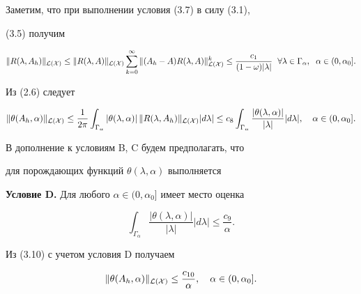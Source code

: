 


Заметим, что при выполнении условия (3.7) в силу (3.1), 


(3.5) получим


$$ 


\|R(\lambda,A_h)\|_{\cal L(X)}\le \|R(\lambda,A)\|_{\cal L(X)} 


\sum^\infty_{k=0}\|(A_h-A)R(\lambda,A)\|^k_{\cal L(X)}\le 


\frac{c_1}{(1-\omega)|\lambda|}\ \; \forall\lambda\in\Gamma_\alpha, 


\ \; \alpha\in(0,\alpha_0]. 


$$ 


Из (2.6) следует


\begin{equation} 


\|\theta(A_h,\alpha)\|_{\cal L(X)}\le\frac{1}{2\pi} 


\int_{\Gamma_\alpha}|\theta(\lambda,\alpha)|\,\|R(\lambda,A_h) 


\|_{\cal L(X)}|d\lambda|\le c_8\int_{\Gamma_\alpha} 


\frac{|\theta(\lambda,\alpha)|}{|\lambda|}|d\lambda|,\quad 


\alpha\in(0,\alpha_0]. 


\end{equation} 


В дополнение к условиям B, C будем предполагать, что 


для порождающих функций $\theta(\lambda,\alpha)$ выполняется


\medskip





{\bf Условие D.} Для любого $\alpha\in(0,\alpha_0]$ имеет место оценка 


$$ 


\int_{\Gamma_\alpha}\frac{|\theta(\lambda,\alpha)|}{|\lambda|} 


|d\lambda|\le\frac{c_9}{\alpha}. 


$$ 


 


Из (3.10) с учетом условия D получаем 


\begin{equation} 


\|\theta(A_h,\alpha)\|_{\cal L(X)}\le\frac{c_{10}}{\alpha}, 


\quad\alpha\in(0,\alpha_0].


\end{equation} 


